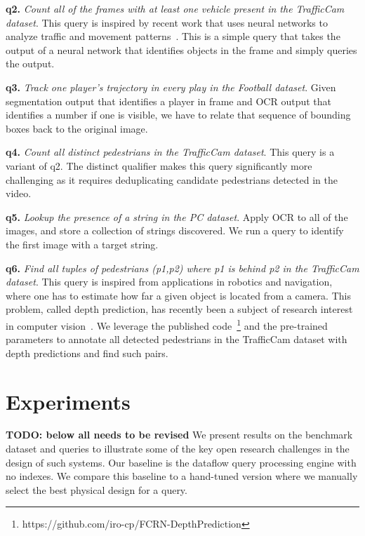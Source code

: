 \vspace{0.25em} \noindent \textbf{q2.} \emph{Count all of the frames with at least one vehicle present in the TrafficCam dataset}. This query is inspired by recent work that uses neural networks to analyze traffic and movement patterns~\cite{kang2017noscope}. This is a simple query that takes the output of a neural network that identifies objects in the frame and simply queries the output.

\vspace{0.25em} \noindent \textbf{q3.} \emph{Track one player's trajectory in every play in the Football dataset}. Given segmentation output that identifies a player in frame and OCR output that identifies a number if one is visible, we have to relate that sequence of bounding boxes back to the original image.

\vspace{0.25em} \noindent \textbf{q4.} \emph{Count all distinct pedestrians in the TrafficCam dataset}. This query is a variant of q2. The distinct qualifier makes this query significantly more challenging as it requires deduplicating candidate pedestrians detected in the video.

\vspace{0.25em} \noindent \textbf{q5.} \emph{Lookup the presence of a string in the PC dataset}. Apply OCR to all of the images, and store a collection of strings discovered. We run a query to identify the first image with a target string.

\vspace{0.25em} \noindent \textbf{q6.} \emph{Find all tuples of pedestrians (p1,p2) where p1 is behind p2 in the TrafficCam dataset}. This query is inspired from applications in robotics and navigation, where one has to estimate how far a given object is located from a camera. This problem, called depth prediction, has recently been a subject of research interest in computer vision~\cite{depthPredictModel}. We leverage the published code~\footnote{https://github.com/iro-cp/FCRN-DepthPrediction} and the pre-trained parameters to annotate all detected pedestrians in the TrafficCam dataset with depth predictions and find such pairs.

\section{Experiments}
\textbf{TODO: below all needs to be revised}
We present results on the benchmark dataset and queries to illustrate some of the key open research challenges in the design of such systems.
Our baseline is the dataflow query processing engine with no indexes.
We compare this baseline to a hand-tuned version where we manually select the best physical design for a query.

